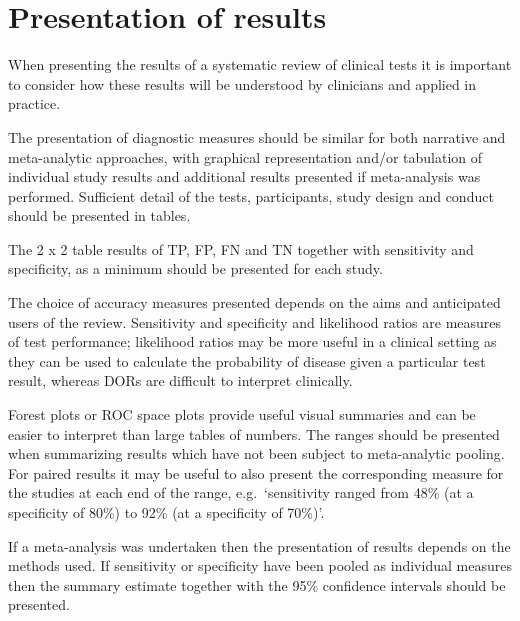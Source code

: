 \documentclass[
  10pt,
  a4paper,
  DIV=11,
  numbers=noendperiod]{scrreprt}
\begin{document}
\section{Presentation of results}\label{presentation-of-results}

When presenting the results of a systematic review of clinical tests it
is important to consider how these results will be understood by
clinicians and applied in practice.

The presentation of diagnostic measures should be similar for both
narrative and meta-analytic approaches, with graphical representation
and/or tabulation of individual study results and additional results
presented if meta-analysis was performed. Sufficient detail of the
tests, participants, study design and conduct should be presented in
tables.

The 2 x 2 table results of TP, FP, FN and TN together with sensitivity
and specificity, as a minimum should be presented for each study.

The choice of accuracy measures presented depends on the aims and
anticipated users of the review. Sensitivity and specificity and
likelihood ratios are measures of test performance; likelihood ratios
may be more useful in a clinical setting as they can be used to
calculate the probability of disease given a particular test result,
whereas DORs are difficult to interpret clinically.

Forest plots or ROC space plots provide useful visual summaries and can
be easier to interpret than large tables of numbers. The ranges should
be presented when summarizing results which have not been subject to
meta-analytic pooling. For paired results it may be useful to also
present the corresponding measure for the studies at each end of the
range, e.g.~`sensitivity ranged from 48\% (at a specificity of 80\%) to
92\% (at a specificity of 70\%)'.

If a meta-analysis was undertaken then the presentation of results
depends on the methods used. If sensitivity or specificity have been
pooled as individual measures then the summary estimate together with
the 95\% confidence intervals should be presented.
\end{document}
